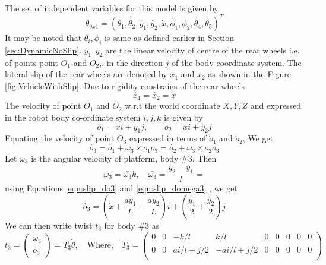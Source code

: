 {The set of independent variables for this model is given by
\begin{equation}
\label{eqn:theta_slip}
\dot{\theta}_{9x1}=(\dot{\theta_1},\dot{\theta_2}, \dot{y_1},\dot{y_2},\dot{x},\dot{\phi_1},\dot{\phi_2},\dot{\theta_4},\dot{\theta_5})^T
\end{equation}
It may be noted that $\theta_i,\phi_i$  is same as defined earlier in Section \ref{sec:DynamicNoSlip}. $\dot{y_1},\dot{y_2}$ are the linear velocity of centre of the rear wheels i.e. of points point $O_1$ and $O_2$,, in the direction $j$ of the body coordinate system. The lateral slip of the rear wheels are denoted by $x_1$ and $x_2$ as shown in the Figure \ref{fig:VehicleWithSlip}. Due to rigidity constrains of the rear wheels
\[\dot{x_1}=\dot{x_2}=\dot{x}\] 
The velocity of point $O_1$ and $ O_2$ w.r.t the world coordinate ${X,Y,Z}$ and expressed in the robot body co-ordinate system ${i,j,k}$ is given by 
\begin{equation}
\label{eqn:slip_do1}
\dot{o_1}=\dot{x}i +\dot{y_1}j, \quad \quad  \dot{o_2}=\dot{x}i +\dot{y_2}j
\end{equation}
Equating the velocity of point $O_3$ expressed in terms of $\dot o_1$ and $\dot o_2$, We get
\begin{equation}
\label{eqn:slip_do3_rel}
\dot{o_3}=\dot{o_1}+\omega_3\times o_1o_3=\dot{o_2}+\omega_3\times o_2o_3
\end{equation}
Let $\omega_3$ is the angular velocity of platform, body \#3. Then 
\begin{equation}
	\label{eqn:slip_domega3}
	\omega_3=\bar{\omega_3}k, \quad \bar{\omega_3}=\frac{\dot{y_2}-\dot{y_1}}{l} =
\end{equation}
using Equations \ref{eqn:slip_do3} and \ref{eqn:slip_domega3} , we get
\begin{equation}
\label{eqn:slip_do3}
\dot{o_3}=(\dot{x}+\frac{a\dot{y_1}}{L}-\frac{a \dot{y_2}}{L})i+(\frac{\dot{y_1}}{2}+\frac{\dot{y_2}}{2})j
\end{equation}
We can then write twist $t_3$ for body \#3 as
\begin{equation}
\label{eqn:slip_t3}
t_3=
\begin{pmatrix}
\omega_3\\
\dot{o_3}
\end{pmatrix}=T_3 \dot{\theta}, \quad \text{Where,} \quad 
T_3=
\begin{pmatrix}
0 & 0& -k/l & k/l & 0 &0 & 0 &0 &0\\
0 & 0& ai/l+ j/2& -ai/l+j/2 & 0 &0 & 0 &0 &0\\ 

\end{pmatrix}
\end{equation}}
